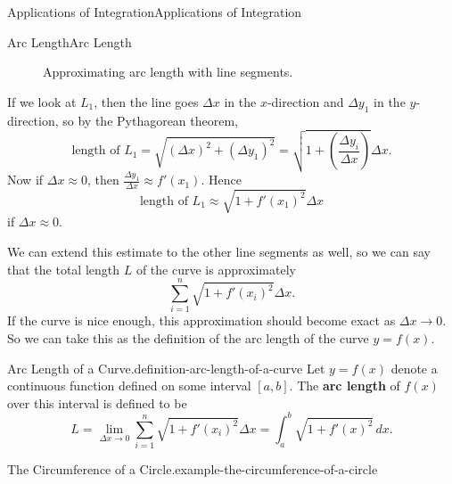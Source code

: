 \documentclass[10pt,]{book}
\newcommand{\terminology}[1]{\textbf{#1}}
\numberwithin{equation}{section}
\begin{document}
\begin{chapterptx}{Applications of Integration}{}{Applications of Integration}{}{}
\begin{sectionptx}{Arc Length}{}{Arc Length}{}{}
\begin{figure}
{
}
\caption{Approximating arc length with line segments.\label{figure-arc-length-breaking-into-line-segments}}
\end{figure}
\hypertarget{p-652}{}%
If we look at \(L_1\), then the line goes \(\Delta x\) in the \(x\)-direction and \(\Delta y_1\) in the \(y\)-direction, so by the Pythagorean theorem,%
\begin{equation*}
\text{length of } L_1 = \sqrt{(\Delta x)^2 + (\Delta y_1)^2} = \sqrt{1 + \left(\frac{\Delta y_{i}}{\Delta x}\right)}\Delta x.
\end{equation*}
Now if \(\Delta x \approx 0\), then \(\frac{\Delta y_{1}}{\Delta x} \approx f'(x_{1})\). Hence%
\begin{equation*}
\text{length of } L_{1} \approx \sqrt{1 + f'(x_{1})^{2}}\Delta x
\end{equation*}
if \(\Delta x\approx 0\).%
\par
\hypertarget{p-653}{}%
We can extend this estimate to the other line segments as well, so we can say that the total length \(L\) of the curve is approximately%
\begin{equation*}
\sum_{i=1}^{n}\sqrt{1 + f'(x_{i})^{2}}\Delta x.
\end{equation*}
If the curve is nice enough, this approximation should become exact as \(\Delta x\to 0\). So we can take this as the definition of the arc length of the curve \(y = f(x)\).%
\begin{definition}{Arc Length of a Curve.}{definition-arc-length-of-a-curve}%
\hypertarget{p-654}{}%
Let \(y = f(x)\) denote a continuous function defined on some interval \([a,b]\). The \terminology{arc length} of \(f(x)\) over this interval is defined to be%
\begin{equation*}
L = \lim_{\Delta x\to0}\sum_{i=1}^{n}\sqrt{1 + f'(x_{i})^{2}}\Delta x = \int_{a}^{b}\sqrt{1 + f'(x)^{2}}\,dx.
\end{equation*}
%
\end{definition}
\begin{example}{The Circumference of a Circle.}{example-the-circumference-of-a-circle}%

\end{example}
\end{sectionptx}
\end{chapterptx}
\end{document}
